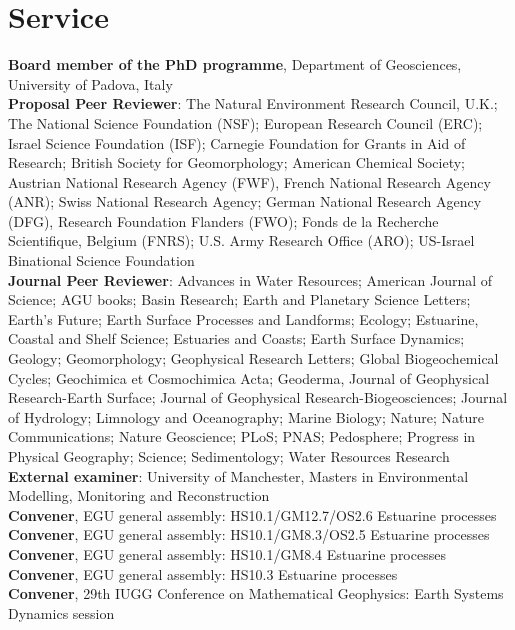 \documentclass[10pt, a4paper]{article}
\newcommand{\years}[1]{\marginnote{\scriptsize #1}}
\begin{document}
\section*{Service}
\years{2017--}\textbf{Board member of the PhD programme}, Department of Geosciences, University of Padova, Italy\\[0.05cm]
\years{2006--}\textbf{Proposal Peer Reviewer}: The Natural Environment Research Council, U.K.; The National Science Foundation (NSF); European Research Council (ERC); Israel Science Foundation (ISF); Carnegie Foundation for Grants in Aid of Research; British Society for Geomorphology; American Chemical Society; Austrian National Research Agency (FWF), French National Research Agency (ANR); Swiss National Research Agency; German National Research Agency (DFG), Research Foundation Flanders (FWO); Fonds de la Recherche Scientifique, Belgium (FNRS); U.S. Army Research Office (ARO); US-Israel Binational Science Foundation\\[0.05cm]
\years{2004--}\textbf{Journal Peer Reviewer}: Advances in Water Resources; American Journal of Science; AGU books; Basin Research; Earth and Planetary Science Letters; Earth's Future; Earth Surface Processes and Landforms; Ecology; Estuarine, Coastal and Shelf Science; Estuaries and Coasts; Earth Surface Dynamics; Geology; Geomorphology; Geophysical Research Letters; Global Biogeochemical Cycles; Geochimica et Cosmochimica Acta; Geoderma, Journal of Geophysical Research-Earth Surface; Journal of Geophysical Research-Biogeosciences; Journal of Hydrology; Limnology and Oceanography; Marine Biology; Nature; Nature Communications; Nature Geoscience; PLoS; PNAS; Pedosphere; Progress in Physical Geography; Science; Sedimentology; Water Resources Research\\[0.05cm]
\years{2014--2017}\textbf{External examiner}: University of Manchester, Masters in Environmental Modelling, Monitoring and Reconstruction\\[0.05cm]\years{2016}\textbf{Convener}, EGU general assembly: HS10.1/GM12.7/OS2.6 Estuarine processes\\[0.05cm]
\years{2015}\textbf{Convener}, EGU general assembly: HS10.1/GM8.3/OS2.5 Estuarine processes\\[0.05cm]
\years{2014}\textbf{Convener}, EGU general assembly: HS10.1/GM8.4 Estuarine processes\\[0.05cm]
\years{2013}\textbf{Convener}, EGU general assembly: HS10.3 Estuarine processes\\[0.05cm]
\years{2012}\textbf{Convener}, 29th IUGG Conference on Mathematical Geophysics: Earth Systems Dynamics session\\[0.05cm]
\end{document}
